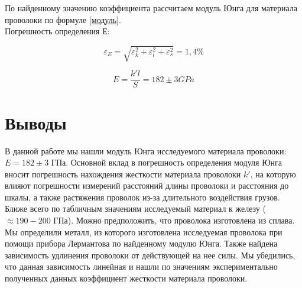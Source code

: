     По найденному значению коэффициента рассчитаем модуль Юнга для материала проволоки по формуле \eqref{модуль}.\\

    Погрешность определения Е:
    
\[\varepsilon_E = \sqrt{\varepsilon_k^2 + \varepsilon_l^2 + \varepsilon_s^2} = 1,4 \%\]

\[E = \frac{k' l}{S} = 182 \pm 3 G Pa\]

    
    
    
    
    
    
    
\section{Выводы}
  
    В данной работе мы нашли модуль Юнга исследуемого материала проволоки: $E = 182 \pm 3 $ ГПа. Основной вклад в погрешность определения модуля Юнга вносит погрешность нахождения жесткости материала проволоки $k'$, на которую влияют погрешности измерений расстояний длины проволоки и расстояния до шкалы, а также растяжения проволок из-за длительного воздействия грузов. Ближе всего по табличным значениям исследуемый материал к железу ($\approx 190 - 200$ ГПа). Можно предположить, что проволока изготовлена из сплава.\\
    
    Мы определили металл, из которого изготовлена исследуемая проволока при помощи прибора Лермантова по найденному модулю Юнга. Также найдена зависимость удлинения проволоки от действующей на нее силы. Мы убедились, что данная зависимость линейная и нашли по значениям экспериментально полученных данных коэффициент жесткости материала проволоки.
    




